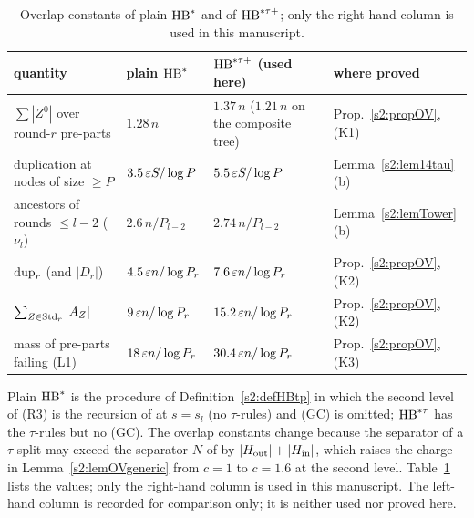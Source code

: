 \begin{table}[ht]
\begin{center}
\begin{tabular}{p{4.6cm}p{2.6cm}p{3.4cm}p{3.2cm}}
\hline
quantity & plain $\mathrm{HB}^{*}$ & $\mathrm{HB}^{*\tau{+}}$ (used here) & where proved\\
\hline
$\sum|Z^0|$ over round-$r$ pre-parts & $1.28\,n$ & $1.37\,n$ ($1.21\,n$ on
the composite tree) & Prop.~\ref{s2:propOV}, (K1)\\
duplication at nodes of size $\ge P$ & $3.5\,\varepsilon S/\log P$ &
$5.5\,\varepsilon S/\log P$ & Lemma~\ref{s2:lem14tau}(b)\\
ancestors of rounds $\le l-2$ ($\nu_l$) & $2.6\,n/P_{l-2}$ &
$2.74\,n/P_{l-2}$ & Lemma~\ref{s2:lemTower}(b)\\
$\mathrm{dup}_r$ (and $|D_r|$) & $4.5\,\varepsilon n/\log P_r$ & $7.6\,\varepsilon n/\log P_r$ &
Prop.~\ref{s2:propOV}, (K2)\\
$\sum_{Z\in\mathrm{Std}_r}|A_Z|$ & $9\,\varepsilon n/\log P_r$ & $15.2\,\varepsilon n/\log P_r$ &
Prop.~\ref{s2:propOV}, (K2)\\
mass of pre-parts failing (L1) & $18\,\varepsilon n/\log P_r$ &
$30.4\,\varepsilon n/\log P_r$ & Prop.~\ref{s2:propOV}, (K3)\\
\hline
\end{tabular}
\end{center}
\caption{Overlap constants of plain $\mathrm{HB}^{*}$ and of $\mathrm{HB}^{*\tau{+}}$; only the
right-hand column is used in this manuscript.}\label{s2:tabTauConstants}
\end{table}

\begin{remark}\label{s2:remTauConstants}
Plain $\mathrm{HB}^{*}$ is the procedure of Definition~\ref{s2:defHBtp} in which the
second level of (R3) is the recursion of \cite[Lemma~14]{BM} at $s=s_l$ (no
$\tau$-rules) and (GC) is omitted; $\mathrm{HB}^{*\tau}$ has the $\tau$-rules but no (GC). The
overlap constants change because the separator of a $\tau$-split may exceed
the separator $N$ of \cite{BM} by $|H_{\mathrm{out}}|+|H_{\mathrm{in}}|$, which raises the charge in
Lemma~\ref{s2:lemOVgeneric} from $c=1$ to $c=1.6$ at the second level.
Table~\ref{s2:tabTauConstants} lists the values; only the right-hand column is
used in this manuscript. The left-hand column is recorded for comparison only;
it is neither used nor proved here.
\deps{\ref{s2:propOV}, \ref{s2:lem14tau}, \ref{s2:lemTower}, \ref{s2:defHBtp}, \ref{s2:lemOVgeneric}}
\end{remark}

